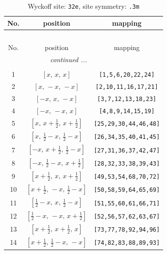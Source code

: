 \documentclass[fleqn,8pt]{jsarticle}
\begin{document}
\begin{longtable}{ccc}
\caption{Wyckoff site: {\tt 32e}, site symmetry: {\tt .3m}}
 \\
 \hline \hline
No. & position & mapping \\ \hline \endfirsthead

\multicolumn{2}{l}{\tablename\ \thetable{}} \\
 \hline \hline
No. & position & mapping \\ \hline \endhead

 \hline \hline
\multicolumn{2}{r}{\footnotesize\it continued ...} \\ \endfoot

 \hline \hline
\multicolumn{2}{r}{} \\ \endlastfoot

1 & $\left[ x,\, x,\, x \right]$ & {\tt [1,5,6,20,22,24]} \\ \hline
2 & $\left[ x,\, - x,\, - x \right]$ & {\tt [2,10,11,16,17,21]} \\ \hline
3 & $\left[ - x,\, x,\, - x \right]$ & {\tt [3,7,12,13,18,23]} \\ \hline
4 & $\left[ - x,\, - x,\, x \right]$ & {\tt [4,8,9,14,15,19]} \\ \hline
5 & $\left[ x,\, x + \frac{1}{2},\, x + \frac{1}{2} \right]$ & {\tt [25,29,30,44,46,48]} \\ \hline
6 & $\left[ x,\, \frac{1}{2} - x,\, \frac{1}{2} - x \right]$ & {\tt [26,34,35,40,41,45]} \\ \hline
7 & $\left[ - x,\, x + \frac{1}{2},\, \frac{1}{2} - x \right]$ & {\tt [27,31,36,37,42,47]} \\ \hline
8 & $\left[ - x,\, \frac{1}{2} - x,\, x + \frac{1}{2} \right]$ & {\tt [28,32,33,38,39,43]} \\ \hline
9 & $\left[ x + \frac{1}{2},\, x,\, x + \frac{1}{2} \right]$ & {\tt [49,53,54,68,70,72]} \\ \hline
10 & $\left[ x + \frac{1}{2},\, - x,\, \frac{1}{2} - x \right]$ & {\tt [50,58,59,64,65,69]} \\ \hline
11 & $\left[ \frac{1}{2} - x,\, x,\, \frac{1}{2} - x \right]$ & {\tt [51,55,60,61,66,71]} \\ \hline
12 & $\left[ \frac{1}{2} - x,\, - x,\, x + \frac{1}{2} \right]$ & {\tt [52,56,57,62,63,67]} \\ \hline
13 & $\left[ x + \frac{1}{2},\, x + \frac{1}{2},\, x \right]$ & {\tt [73,77,78,92,94,96]} \\ \hline
14 & $\left[ x + \frac{1}{2},\, \frac{1}{2} - x,\, - x \right]$ & {\tt [74,82,83,88,89,93]} \\ \hline

\end{longtable}
\end{document}
